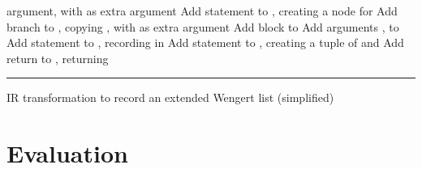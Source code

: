 \begin{algorithm}[p]
\begin{algorithmic}
    argument, with  as extra argument
    \Else
    \State Add statement  to , creating a node for 
    \State Add branch to , copying , with  as
    extra argument
    \EndIf
    \EndFor
    \EndFor
    \Statex
    \State Add block  to 
    \State Add arguments ,  to 
    \State Add statement to , recording  in
    \State Add statement  to , creating a tuple of
     and 
    \State Add return to , returning 
    \EndFunction
  \end{algorithmic}
  \smallskip
  \hrule
  \caption{IR transformation to record an extended Wengert list (simplified) \label{alg:ir-transform}}
\end{algorithm}

\section{Evaluation}
\label{sec:irtracker-eval}

